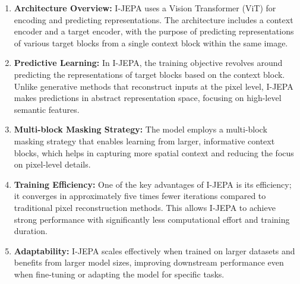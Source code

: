\documentclass{article} %
\begin{document}
\begin{enumerate}
   \item {\bf Architecture Overview:} I-JEPA uses a Vision Transformer (ViT) for encoding and predicting representations. The architecture includes a context encoder and a target encoder, with the purpose of predicting representations of various target blocks from a single context block within the same image.
   \item {\bf Predictive Learning:} In I-JEPA, the training objective revolves around predicting the representations of target blocks based on the context block. Unlike generative methods that reconstruct inputs at the pixel level, I-JEPA makes predictions in abstract representation space, focusing on high-level semantic features.
   \item {\bf Multi-block Masking Strategy:} The model employs a multi-block masking strategy that enables learning from larger, informative context blocks, which helps in capturing more spatial context and reducing the focus on pixel-level details.
   \item {\bf Training Efficiency:} One of the key advantages of I-JEPA is its efficiency; it converges in approximately five times fewer iterations compared to traditional pixel reconstruction methods. This allows I-JEPA to achieve strong performance with significantly less computational effort and training duration.
   \item {\bf Adaptability:} I-JEPA scales effectively when trained on larger datasets and benefits from larger model sizes, improving downstream performance even when fine-tuning or adapting the model for specific tasks.
\end{enumerate}
\end{document}
